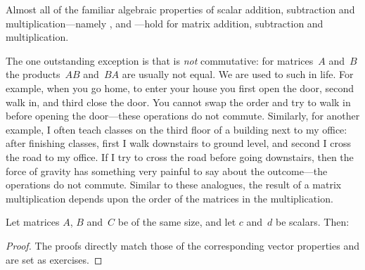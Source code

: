 Almost all of the familiar algebraic properties of scalar addition, 
subtraction and multiplication---namely ,  and ---hold for matrix addition, subtraction and multiplication.

The one outstanding exception is that  is \emph{not} commutative: for matrices~\(A\) and~\(B\) the products~\(AB\) and~\(BA\) are usually not equal.
We are used to such  in life.
For example, when you go home, to enter your house you first open the door, second walk in, and third close the door. 
You cannot swap the order and try to walk in before opening the door---these operations do not commute.
Similarly, for another example, I often teach classes on the third floor of a building next to my office: after finishing classes, first I walk downstairs to ground level, and second I cross the road to my office.
If I try to cross the road before going downstairs, then the force of gravity has something very painful to say about the outcome---the operations do not commute.
Similar to these analogues, the result of a matrix multiplication depends upon the order of the matrices in the multiplication.


\begin{theorem} \label{thm:pasm}
Let matrices \(A\), \(B\) and~\(C\) be of the same size, and let \(c\) and~\(d\) be scalars.  Then:
\end{theorem}

\begin{proof}
The proofs directly match those of the corresponding vector properties and are set as exercises.
\end{proof}



